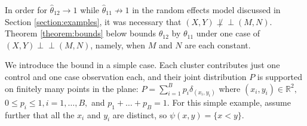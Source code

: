 \documentclass[12pt]{article}
\DeclareMathOperator{\AUC}{AUC}
\newcommand{\E}{E}
\renewcommand{\P}{P}
\newcommand{\cind}{\perp \!\!\! \perp}
\newcommand{\aucindiv}{\theta_{11}}%
\newcommand{\aucpop}{\theta_{12}}%
\newcommand{\aucindivhat}{\hat{\theta}_{11}}%
\newcommand{\aucpophat}{\hat{\theta}_{12}}%
\newcommand{\B}{B}
\newtheorem{lemma}[theorem]{Lemma}
\begin{document}



In order for $\aucpophat\to 1$ while $\aucindivhat\not\to 1$ in the
random effects model discussed in Section \ref{section:examples}, it
was necessary that $(X,Y)\not\cind (M,N)$. Theorem
\ref{theorem:bounds} below bounds $\aucpop$ by $\aucindiv$ under one case of $(X,Y)\cind (M,N)$, namely, when $M$ and $N$ are
each constant.


We introduce the bound in a simple case. Each cluster contributes
just one control and one case observation each, and their joint
distribution $\P$ is supported on finitely many points in the
plane:  %
  $\P = \sum_{i=1}^\B p_i \delta_{(x_i,y_i)}$
  where $(x_i,y_i) \in \mathbb{R}^2,$ $0\le p_i\le 1,i=1,\ldots,B,$ 
  and $p_1+\ldots+p_\B=1.$
For this simple example, assume further that all the $x_i$ and $y_i$ are distinct, so $\psi(x,y)=\{x<y\}$.
\end{document}
